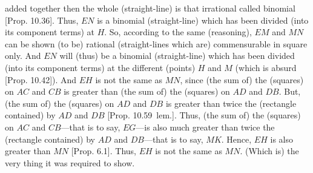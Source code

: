 \begin{Parallel}{}{}
{added together then the whole (straight-line) is that irrational called
binomial [Prop. 10.36]. Thus, $EN$
is a binomial (straight-line) which has been divided (into its component terms) at $H$. So, according to
the same (reasoning), $EM$ and $MN$ can be shown (to be) rational
(straight-lines which are) commensurable in square only. And $EN$
will (thus) be a binomial (straight-line) which has been divided (into its component terms) at the different (points)
$H$ and $M$ (which is absurd [Prop. 10.42]).
And $EH$ is not the same as $MN$, since (the sum of) the
(squares) on $AC$ and $CB$ is greater than (the sum of) the (squares) on
$AD$ and $DB$. But, (the sum of) the (squares) on $AD$ and $DB$
is greater than twice the (rectangle contained) by $AD$ and $DB$ [Prop. 10.59~lem.]. Thus,  (the sum of) the (squares) on $AC$ and $CB$---that is to say, $EG$---is also much greater than twice the (rectangle contained) by 
$AD$ and $DB$---that is to say, $MK$. Hence, $EH$ is also greater
than $MN$ [Prop. 6.1]. Thus, $EH$ is not the same as $MN$. (Which is) the very thing
it was required to show.}
\end{Parallel}



